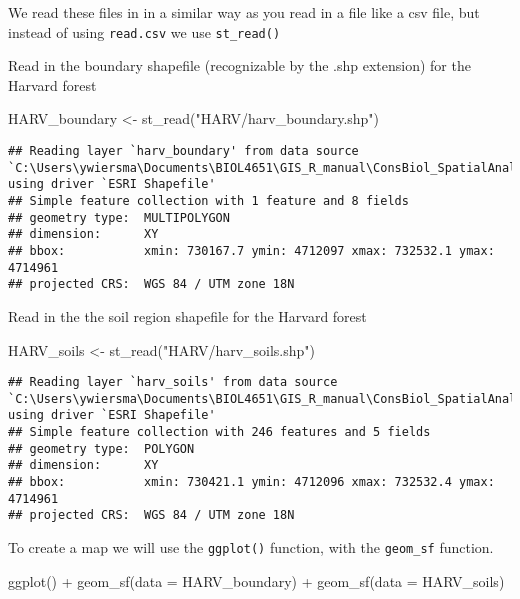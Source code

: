 \documentclass[
]{book}
\newenvironment{Shaded}{\begin{snugshade}}{\end{snugshade}}
\newcommand{\AttributeTok}[1]{\textcolor[rgb]{0.77,0.63,0.00}{#1}}
\newcommand{\FunctionTok}[1]{\textcolor[rgb]{0.00,0.00,0.00}{#1}}
\newcommand{\NormalTok}[1]{#1}
\newcommand{\OtherTok}[1]{\textcolor[rgb]{0.56,0.35,0.01}{#1}}
\newcommand{\SpecialCharTok}[1]{\textcolor[rgb]{0.00,0.00,0.00}{#1}}
\newcommand{\StringTok}[1]{\textcolor[rgb]{0.31,0.60,0.02}{#1}}
\begin{document}
We read these files in in a similar way as you read in a file like a csv file, but instead of using \texttt{read.csv} we use \texttt{st\_read()}

Read in the boundary shapefile (recognizable by the .shp extension) for the Harvard forest

\begin{Shaded}
\begin{Highlighting}[]
\NormalTok{HARV\_boundary }\OtherTok{\textless{}{-}} \FunctionTok{st\_read}\NormalTok{(}\StringTok{"HARV/harv\_boundary.shp"}\NormalTok{)}
\end{Highlighting}
\end{Shaded}

\begin{verbatim}
## Reading layer `harv_boundary' from data source `C:\Users\ywiersma\Documents\BIOL4651\GIS_R_manual\ConsBiol_SpatialAnalysis\HARV\harv_boundary.shp' using driver `ESRI Shapefile'
## Simple feature collection with 1 feature and 8 fields
## geometry type:  MULTIPOLYGON
## dimension:      XY
## bbox:           xmin: 730167.7 ymin: 4712097 xmax: 732532.1 ymax: 4714961
## projected CRS:  WGS 84 / UTM zone 18N
\end{verbatim}

Read in the the soil region shapefile for the Harvard forest

\begin{Shaded}
\begin{Highlighting}[]
\NormalTok{HARV\_soils }\OtherTok{\textless{}{-}} \FunctionTok{st\_read}\NormalTok{(}\StringTok{"HARV/harv\_soils.shp"}\NormalTok{)}
\end{Highlighting}
\end{Shaded}

\begin{verbatim}
## Reading layer `harv_soils' from data source `C:\Users\ywiersma\Documents\BIOL4651\GIS_R_manual\ConsBiol_SpatialAnalysis\HARV\harv_soils.shp' using driver `ESRI Shapefile'
## Simple feature collection with 246 features and 5 fields
## geometry type:  POLYGON
## dimension:      XY
## bbox:           xmin: 730421.1 ymin: 4712096 xmax: 732532.4 ymax: 4714961
## projected CRS:  WGS 84 / UTM zone 18N
\end{verbatim}

To create a map we will use the \texttt{ggplot()} function, with the \texttt{geom\_sf} function.

\begin{Shaded}
\begin{Highlighting}[]
\FunctionTok{ggplot}\NormalTok{() }\SpecialCharTok{+}
  \FunctionTok{geom\_sf}\NormalTok{(}\AttributeTok{data =}\NormalTok{ HARV\_boundary) }\SpecialCharTok{+} 
  \FunctionTok{geom\_sf}\NormalTok{(}\AttributeTok{data =}\NormalTok{ HARV\_soils)}
\end{Highlighting}
\end{Shaded}
\end{document}
